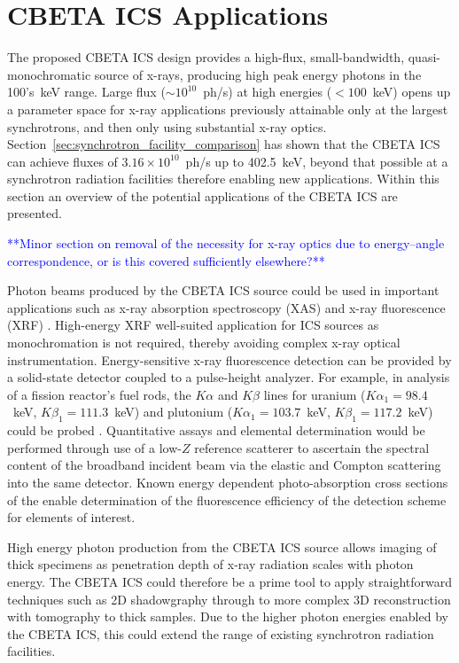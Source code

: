 \documentclass[../main.tex]{subfiles}
\begin{document}
\section{CBETA ICS Applications}
\label{sec:CBETA_ICS_applications}

The proposed CBETA ICS design provides a high-flux, small-bandwidth, quasi-monochromatic source of x-rays, producing high peak energy photons in the 100's~\si{\kilo\electronvolt} range. Large flux ($\sim 10^{10}$~ph/\si{\second}) at high energies ($< 100$~\si{\kilo\electronvolt}) opens up a parameter space for x-ray applications previously attainable only at the largest synchrotrons, and then only using substantial x-ray optics. Section~\ref{sec:synchrotron_facility_comparison} has shown that the CBETA ICS can achieve fluxes of $3.16\times 10^{10}$~ph/\si{\second} up to 402.5~\si{\kilo\electronvolt}, beyond that possible at a synchrotron radiation facilities therefore enabling new applications. Within this section an overview of the potential applications of the CBETA ICS are presented.   

\textcolor{blue}{**Minor section on removal of the necessity for x-ray optics due to energy--angle correspondence, or is this covered sufficiently elsewhere?**}

Photon beams produced by the CBETA ICS source could be used in important applications such as x-ray absorption spectroscopy (XAS) and x-ray fluorescence (XRF) \cite{willmott2019introduction}. High-energy XRF well-suited application for ICS sources as monochromation is not required, thereby avoiding complex x-ray optical instrumentation. Energy-sensitive x-ray fluorescence detection can be provided by a solid-state detector coupled to a pulse-height analyzer. For example, in analysis of a fission reactor's fuel rods, the $K\alpha$ and $K\beta$ lines for uranium ($K\alpha_{1} = 98.4$~\si{\kilo\electronvolt}, $K\beta_{1} = 111.3$~\si{\kilo\electronvolt}) and plutonium ($K\alpha_{1} = 103.7$~\si{\kilo\electronvolt}, $K\beta_{1} = 117.2$~\si{\kilo\electronvolt}) could be probed \cite{havrilla2015feasibility}. Quantitative assays and elemental determination would be performed through use of a low-$Z$ reference scatterer to ascertain the spectral content of the broadband incident beam via the elastic and Compton scattering into the same detector. Known energy dependent photo-absorption cross sections of the enable determination of the fluorescence efficiency of the detection scheme for elements of interest.

High energy photon production from the CBETA ICS source allows imaging of thick specimens as penetration depth of x-ray radiation scales with photon energy. The CBETA ICS could therefore be a prime tool to apply straightforward techniques such as 2D shadowgraphy through to more complex 3D reconstruction with tomography \cite{als2011elements} to thick samples. Due to the higher photon energies enabled by the CBETA ICS, this could extend the range of existing synchrotron radiation facilities.
\end{document}
